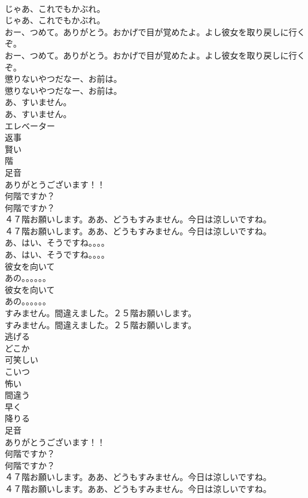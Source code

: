 \documentclass[8pt]{extreport}
\begin{document}
\begin{CJK}{UTF8}{min}
\\	じゃあ、これでもかぶれ。	
\\	じゃあ、これでもかぶれ。 
\\	おー、つめて。ありがとう。おかげで目が覚めたよ。よし彼女を取り戻しに行くぞ。	
\\	おー、つめて。ありがとう。おかげで目が覚めたよ。よし彼女を取り戻しに行くぞ。 
\\	懲りないやつだなー、お前は。	
\\	懲りないやつだなー、お前は。 
\\	あ、すいません。	
\\	あ、すいません。 
\\	エレベーター
\\	返事
\\	賢い
\\	階
\\	足音
\\	ありがとうございます！！	
\\	何階ですか？	
\\	何階ですか？ 
\\	４７階お願いします。ああ、どうもすみません。今日は涼しいですね。	
\\	４７階お願いします。ああ、どうもすみません。今日は涼しいですね。 
\\	あ、はい、そうですね。。。。	
\\	あ、はい、そうですね。。。。 
\\	彼女を向いて
\\	あの。。。。。。	
\\	彼女を向いて
\\	あの。。。。。。 
\\	すみません。間違えました。２５階お願いします。	
\\	すみません。間違えました。２５階お願いします。 
\\	逃げる
\\	どこか
\\	可笑しい
\\	こいつ
\\	怖い
\\	間違う
\\	早く
\\	降りる
\\	足音
\\	ありがとうございます！！	
\\	何階ですか？	
\\	何階ですか？ 
\\	４７階お願いします。ああ、どうもすみません。今日は涼しいですね。	
\\	４７階お願いします。ああ、どうもすみません。今日は涼しいですね。 

\end{CJK}
\end{document}
